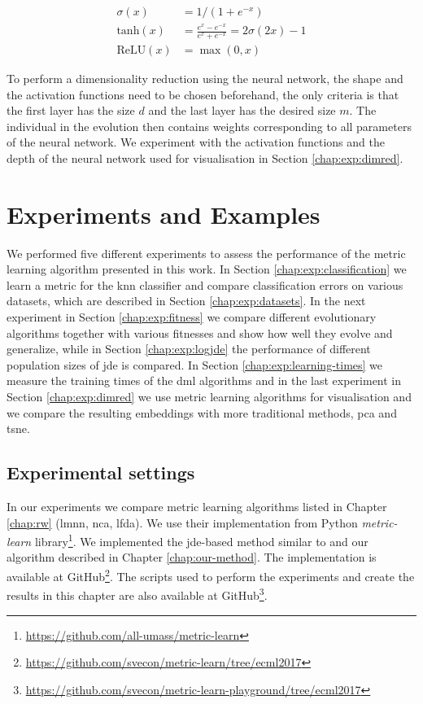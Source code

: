 \documentclass[12pt,a4paper]{report}
\begin{document}
\begin{align}
\sigma(x) &= 1/(1+e^{-x}) \label{eq:nn:sigm} \\
\text{tanh}(x) &= \frac{e^x-e^{-x}}{e^x+e^{-x}} = 2\sigma(2x)-1 \label{eq:nn:tanh} \\
\text{ReLU}(x) &= \max(0,x) \label{eq:nn:relu}
\end{align}

To perform a dimensionality reduction using the neural network, the shape and the activation functions need to be chosen beforehand, the only criteria is that the first layer has the size $d$ and the last layer has the desired size $m$. The individual in the evolution then contains weights corresponding to all parameters of the neural network. We experiment with the activation functions and the depth of the neural network used for visualisation in Section \ref{chap:exp:dimred}.



\chapter{Experiments and Examples} \label{chap:exp}
We performed five different experiments to assess the performance of the metric learning algorithm presented in this work. In Section \ref{chap:exp:classification} we learn a metric for the \ac{knn} classifier and compare classification errors on various datasets, which are described in Section \ref{chap:exp:datasets}. In the next experiment in Section \ref{chap:exp:fitness} we compare different evolutionary algorithms together with various fitnesses and show how well they evolve and generalize, while in Section \ref{chap:exp:logjde} the performance of different population sizes of \ac{jde} is compared. In Section \ref{chap:exp:learning-times} we measure the training times of the \ac{dml} algorithms and in the last experiment in Section \ref{chap:exp:dimred} we use metric learning algorithms for visualisation and we compare the resulting embeddings with more traditional methods, \ac{pca} and \ac{tsne}.

\section{Experimental settings} 
In our experiments we compare metric learning algorithms listed in Chapter \ref{chap:rw} (\ac{lmnn}, \ac{nca}, \ac{lfda}). We use their implementation from Python \textit{metric-learn} library\footnote{\url{https://github.com/all-umass/metric-learn}}. We implemented the \ac{jde}-based method similar to \cite{fukui2013evolutionary} and our algorithm described in Chapter \ref{chap:our-method}. The implementation is available at GitHub\footnote{\url{https://github.com/svecon/metric-learn/tree/ecml2017}}. The scripts used to perform the experiments and create the results in this chapter are also available at GitHub\footnote{\url{https://github.com/svecon/metric-learn-playground/tree/ecml2017}}.
\end{document}
